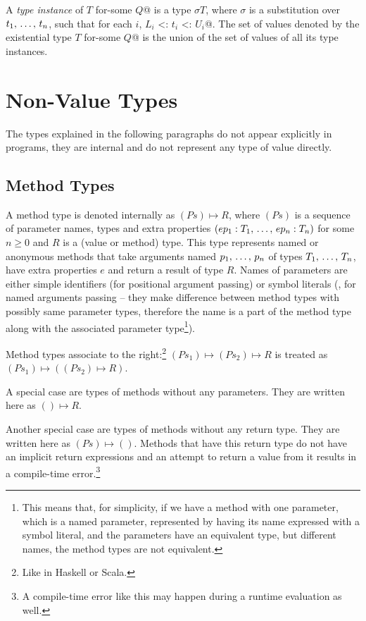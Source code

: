 A {\em type instance} of \lstinline@$T$ for-some {$Q$}@ is a type $\sigma T$, where $\sigma$ is a substitution over $t_1 ,\, \ldots ,\, t_n$, such that for each $i$, \lstinline@$L_i$ <: $t_i$ <: $U_i$@. The set of values denoted by the existential type \lstinline@$T$ for-some {$Q$}@ is the union of the set of values of all its type instances. 

\section{Non-Value Types}

The types explained in the following paragraphs do not appear explicitly in programs, they are internal and do not represent any type of value directly. 

\subsection{Method Types}
\label{sec:method-types}

A method type is denoted internally as $(Ps) \mapsto R$, where $(Ps)$ is a sequence of parameter names, types and extra properties $(ep_1 : T_1 ,\, \ldots ,\, ep_n : T_n)$ for some $n \geq 0$ and $R$ is a (value or method) type. This type represents named or anonymous methods that take arguments named $p_1 ,\, \ldots ,\, p_n$ of types $T_1 ,\, \ldots ,\, T_n$, have extra properties $e$ and return a result of type $R$. Names of parameters are either simple identifiers (for positional argument passing) or symbol literals (, for named arguments passing -- they make difference between method types with possibly same parameter types, therefore the name is a part of the method type along with the associated parameter type\footnote{This means that, for simplicity, if we have a method with one parameter, which is a named parameter, represented by having its name expressed with a symbol literal, and the parameters have an equivalent type, but different names, the method types are not equivalent.}). 

Method types associate to the right:\footnote{Like in Haskell or Scala.} \newline
$(Ps_1) \mapsto (Ps_2) \mapsto R$ is treated as $(Ps_1) \mapsto ((Ps_2) \mapsto R)$. 

A special case are types of methods without any parameters. They are written here as $() \mapsto R$. 

Another special case are types of methods without any return type. They are written here as $(Ps) \mapsto ()$. Methods that have this return type do not have an implicit return expressions and an attempt to return a value from it results in a compile-time error.\footnote{A compile-time error like this may happen during a runtime evaluation as well.}

